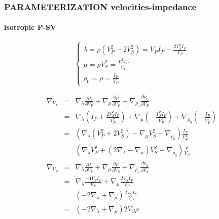 \documentclass[9pt]{beamer}
\newcommand{\partderi}[2]{\frac{\partial#1}{\partial#2}}
\begin{document}
\begin{frame}\frametitle{PARAMETERIZATION velocities-impedance}
\framesubtitle{isotropic P-SV}

  
  \begin{minipage}{\linewidth}
    \[\left\{ \begin{array}{l}
      \lambda = \rho (V_P^2-2V_S^2) = V_PI_P - \frac{2V_S^2I_P}{V_P} \\
      \mu    = \rho V_S^2 = \frac{V_S^2I_P}{V_P} \\
      \rho_0 = \rho = \frac{I_P}{V_P}
    \end{array} \right.\]
    
    \begin{eqnarray}
      \nabla_{V_P} &=& \nabla_\lambda \partderi{\lambda}{V_P} + \nabla_\mu \partderi{\mu}{V_P} + \nabla_{\rho_0} \partderi{\rho_0}{V_P} \nonumber\\
                   &=& \nabla_\lambda \left(I_P+\frac{2V_S^2I_P}{V_P^2}\right) + \nabla_\mu \left(-\frac{V_S^2I_P}{V_P^2}\right) + \nabla_{\rho_0} \left(-\frac{I_P}{V_P^2}\right) \nonumber\\
                   &=& \left( \nabla_\lambda (V_P^2+2V_S^2) - \nabla_\mu V_S^2 - \nabla_{\rho_0} \right) \frac{I_P}{V_P^2} \nonumber\\
                   &=& \left( \nabla_\lambda V_P^2 + (2\nabla_\lambda-\nabla_\mu) V_S^2 - \nabla_{\rho_0} \right) \frac{\rho}{V_P} \nonumber\\
      \nabla_{V_S} &=& \nabla_\lambda \partderi{\lambda}{V_S} + \nabla_\mu \partderi{\mu}{V_S} + \nabla_{\rho_0} \partderi{\rho_0}{V_S} \nonumber\\
                   &=& \nabla_\lambda \frac{-4V_SI_P}{V_P} + \nabla_\mu \frac{2V_SI_P}{V_P} \nonumber\\
                   &=& \left( -2\nabla_\lambda + \nabla_\mu \right) \frac{2V_SI_P}{V_P} \nonumber\\
                   &=& \left( -2\nabla_\lambda + \nabla_\mu \right) 2V_S\rho \nonumber
    \end{eqnarray}


\end{minipage}
\end{frame}
\end{document}
